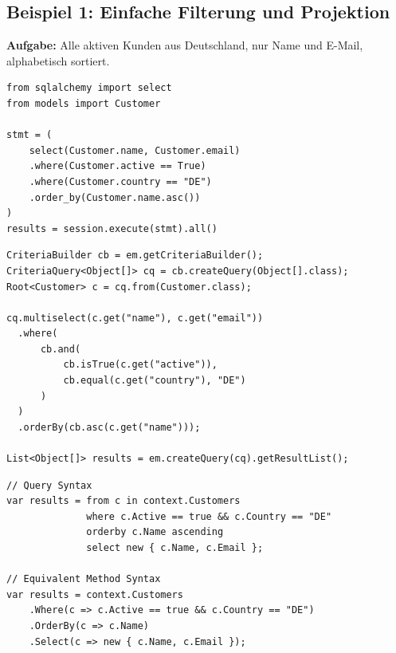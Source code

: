 \subsection{Beispiel 1: Einfache Filterung und Projektion}
\label{subsec:bsp1}

\textbf{Aufgabe:} Alle aktiven Kunden aus Deutschland, nur Name und E-Mail,
alphabetisch sortiert.

\begin{lstlisting}[style=pythonstyle, caption={Beispiel 1 -- Python (SQLAlchemy 2.0)},
  label=lst:bsp1_py]
from sqlalchemy import select
from models import Customer

stmt = (
    select(Customer.name, Customer.email)
    .where(Customer.active == True)
    .where(Customer.country == "DE")
    .order_by(Customer.name.asc())
)
results = session.execute(stmt).all()
\end{lstlisting}

\begin{lstlisting}[style=javastyle, caption={Beispiel 1 -- Java (JPA Criteria API)},
  label=lst:bsp1_java]
CriteriaBuilder cb = em.getCriteriaBuilder();
CriteriaQuery<Object[]> cq = cb.createQuery(Object[].class);
Root<Customer> c = cq.from(Customer.class);

cq.multiselect(c.get("name"), c.get("email"))
  .where(
      cb.and(
          cb.isTrue(c.get("active")),
          cb.equal(c.get("country"), "DE")
      )
  )
  .orderBy(cb.asc(c.get("name")));

List<Object[]> results = em.createQuery(cq).getResultList();
\end{lstlisting}

\begin{lstlisting}[style=csharpstyle, caption={Beispiel 1 -- C\# (EF Core / LINQ)},
  label=lst:bsp1_cs]
// Query Syntax
var results = from c in context.Customers
              where c.Active == true && c.Country == "DE"
              orderby c.Name ascending
              select new { c.Name, c.Email };

// Equivalent Method Syntax
var results = context.Customers
    .Where(c => c.Active == true && c.Country == "DE")
    .OrderBy(c => c.Name)
    .Select(c => new { c.Name, c.Email });
\end{lstlisting}

